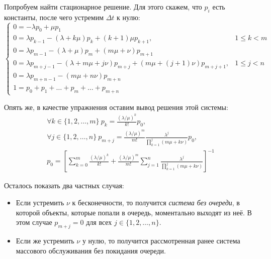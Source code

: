 Попробуем найти стационарное решение. Для этого скажем, что \(p_{i}\) есть 
константы, после чего устремим \(\Delta t\) к нулю:
\[
	\begin{cases}
	0 = -\lambda p_{0} + \mu p_{1} \\
	0 = \lambda p_{k - 1} - (\lambda + k\mu)p_{k} + (k + 1)\mu p_{k + 1}, & 1 
	\leq k < m \\
	0 = \lambda p_{m - 1} - (\lambda + \mu) p_{m} + (m\mu + \nu)p_{m + 1} \\
	0 = \lambda p_{m + j - 1} - (\lambda + m\mu + j\nu)p_{m + j} + (m\mu + (j + 
	1)\nu)p_{m + j + 1}, & 1 \leq j < n \\
	0 = \lambda p_{m + n - 1} - (m\mu + n\nu)p_{m + n} \\
	1 = p_{0} + p_{1} + \ldots + p_{m} + \ldots + p_{m + n}
	\end{cases}
\]

Опять же, в качестве упражнения оставим вывод решения этой системы:
\begin{gather*}
	\forall k \in \{1, 2, \ldots, m\}\ p_{k} = 
	\frac{(\lambda/\mu)^{k}}{k!}p_{0}, \\
	\forall j \in \{1, 2, \ldots, n\}\ p_{m + j} = 
	\frac{(\lambda/\mu)^{m}}{m!}\frac{\lambda^{j}}{\prod_{k = 1}^{j}(m\mu + 
	k\nu)}p_{0}, \\
	p_{0} = \left[\sum_{k = 0}^{m}\frac{(\lambda/\mu)^{k}}{k!} + 
	\frac{(\lambda/\mu)^{m}}{m!}\sum_{j = 1}^{n}\frac{\lambda^{j}}{\prod_{k = 
	1}^{j}(m\mu + k\nu)}\right]^{-1}
\end{gather*}

Осталось показать два частных случая:
\begin{itemize}
	\item Если устремить \(\nu\) к бесконечности, то получится \emph{система 
	без очереди}, в которой объекты, которые попали в очередь, моментально 
	выходят из неё. В этом случае \(p_{m + j} = 0\) для всех \(j \in \{1, 2, 
	\ldots, n\}\).
	\item Если же устремить \(\nu\) у нулю, то получится рассмотренная ранее 
	система массового обслуживания без покидания очереди.
\end{itemize}
